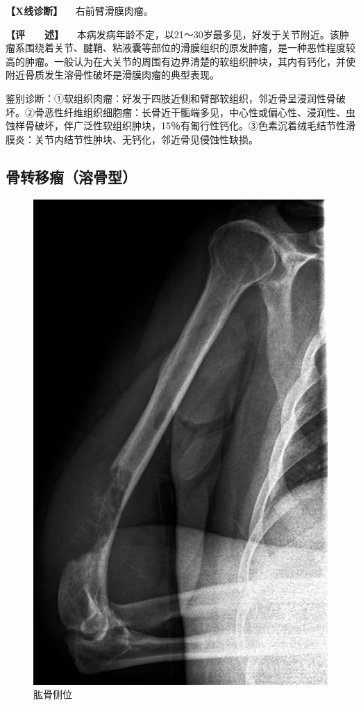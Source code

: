 \textbf{【X线诊断】} 　右前臂滑膜肉瘤。

\textbf{【评　　述】}
　本病发病年龄不定，以21～30岁最多见，好发于关节附近。该肿瘤系围绕着关节、腱鞘、粘液囊等部位的滑膜组织的原发肿瘤，是一种恶性程度较高的肿瘤。一般认为在大关节的周围有边界清楚的软组织肿块，其内有钙化，并使附近骨质发生溶骨性破坏是滑膜肉瘤的典型表现。

鉴别诊断：①软组织肉瘤：好发于四肢近侧和臂部软组织，邻近骨呈浸润性骨破坏。②骨恶性纤维组织细胞瘤：长骨近干骺端多见，中心性或偏心性、浸润性、虫蚀样骨破坏，伴广泛性软组织肿块，15％有匍行性钙化。③色素沉着绒毛结节性滑膜炎：关节内结节性肿块、无钙化，邻近骨见侵蚀性缺损。

\subsection{骨转移瘤（溶骨型）}

\begin{figure}[!htbp]
 \centering
 \includegraphics{./images/Image00106.jpg}
 \captionsetup{justification=centering}
 \caption{肱骨侧位}
 \label{fig2-7-21}
  \end{figure} 

